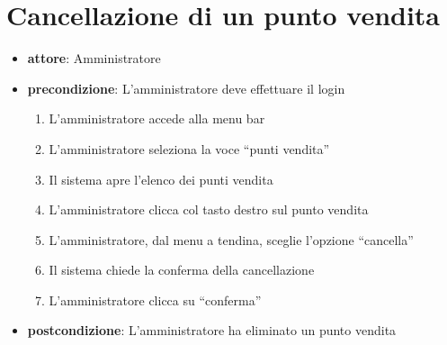 \section{Cancellazione di un punto vendita}
\begin{itemize}
	\item \textbf{attore}: Amministratore
	\item \textbf{precondizione}: L’amministratore deve effettuare il login
	
	\begin{enumerate}
		\item L’amministratore accede alla menu bar
		\item L’amministratore seleziona la voce “punti vendita”
		\item Il sistema apre l’elenco dei punti vendita
		\item L’amministratore clicca col tasto destro sul punto vendita
		\item L’amministratore, dal menu a tendina, sceglie l’opzione “cancella”
		\item Il sistema chiede la conferma della cancellazione
		\item L’amministratore clicca su “conferma”
	\end{enumerate}

	\item \textbf{postcondizione}: L’amministratore ha eliminato un punto vendita
\end{itemize}


